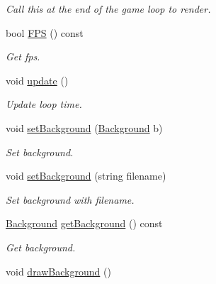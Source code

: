 \begin{DoxyCompactItemize}
\begin{DoxyCompactList}\small\item\em Call this at the end of the game loop to render. \end{DoxyCompactList}\item 
bool \hyperlink{classEngine_a5932cbe5ddf7772028bb6250c5ce75fc}{F\+PS} () const \hypertarget{classEngine_a5932cbe5ddf7772028bb6250c5ce75fc}{}\label{classEngine_a5932cbe5ddf7772028bb6250c5ce75fc}

\begin{DoxyCompactList}\small\item\em Get fps. \end{DoxyCompactList}\item 
void \hyperlink{classEngine_ad2ff110d5a86c1cd60b541d65915ac48}{update} ()\hypertarget{classEngine_ad2ff110d5a86c1cd60b541d65915ac48}{}\label{classEngine_ad2ff110d5a86c1cd60b541d65915ac48}

\begin{DoxyCompactList}\small\item\em Update loop time. \end{DoxyCompactList}\item 
void \hyperlink{classEngine_a690ac76faed3d2a9f1f582a2e6fc8c85}{set\+Background} (\hyperlink{classBackground}{Background} b)\hypertarget{classEngine_a690ac76faed3d2a9f1f582a2e6fc8c85}{}\label{classEngine_a690ac76faed3d2a9f1f582a2e6fc8c85}

\begin{DoxyCompactList}\small\item\em Set background. \end{DoxyCompactList}\item 
void \hyperlink{classEngine_a376e4a1ba9adc079e1da9b28a290abd2}{set\+Background} (string filename)\hypertarget{classEngine_a376e4a1ba9adc079e1da9b28a290abd2}{}\label{classEngine_a376e4a1ba9adc079e1da9b28a290abd2}

\begin{DoxyCompactList}\small\item\em Set background with filename. \end{DoxyCompactList}\item 
\hyperlink{classBackground}{Background} \hyperlink{classEngine_aa9398f6b48392dc520ab8c529e1d10c4}{get\+Background} () const \hypertarget{classEngine_aa9398f6b48392dc520ab8c529e1d10c4}{}\label{classEngine_aa9398f6b48392dc520ab8c529e1d10c4}

\begin{DoxyCompactList}\small\item\em Get background. \end{DoxyCompactList}\item 
void \hyperlink{classEngine_aa84c13e84d00fd3b0389a9a076ec194f}{draw\+Background} ()\hypertarget{classEngine_aa84c13e84d00fd3b0389a9a076ec194f}{}\label{classEngine_aa84c13e84d00fd3b0389a9a076ec194f}


\end{DoxyCompactItemize}
